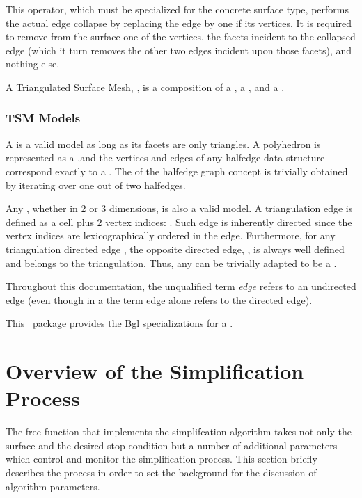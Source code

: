 This operator, which must be specialized for the concrete surface type, performs the actual edge collapse by replacing the edge by one if its vertices. It is required to remove from the surface one of the vertices, the facets incident to the collapsed edge (which it turn removes the other two edges incident upon those facets), and nothing else.

A Triangulated Surface Mesh, , is a composition of a , a , and a
.

\subsubsection{TSM Models}

A  is a valid  model as long as its facets are only triangles. A polyhedron is represented as a ,and the vertices and edges of any halfedge data structure correspond exactly to a . The  of the halfedge graph concept is trivially obtained by iterating over one out of two halfedges.

Any , whether in 2 or 3 dimensions, is also a valid  model. A triangulation edge is defined as a cell plus 2 vertex indices: . Such edge is inherently directed since the vertex indices are lexicographically ordered in the edge. Furthermore, for any triangulation directed edge , the opposite directed edge, , is always well defined and belongs to the triangulation. Thus, any  can be trivially adapted to be a . 

Throughout this documentation, the unqualified term {\em edge} refers to an undirected edge (even though in a  the term edge alone refers to the directed edge).

This \cgal\ package provides the {\sc Bgl} specializations for a .

\section{Overview of the Simplification Process}

The free function that implements the simplifcation algorithm takes not only the surface and the desired stop condition but a number of additional parameters which control and monitor the simplification process. This section briefly describes the process in order to set the background for the discussion of algorithm parameters.

